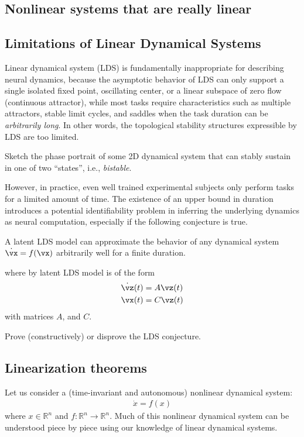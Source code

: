 \documentclass[a4paper,11pt]{exam}
\newcounter{ct}
\newcommand{\field}[1]{\ensuremath{\mathbb{#1}}}
\newcommand{\reals}{\field{R}}
\begin{document}
\begin{questions}
\newpage
\section{Nonlinear systems that are really linear}
\subsection{Limitations of Linear Dynamical Systems}
Linear dynamical system (LDS) is fundamentally inappropriate for describing neural dynamics, because the asymptotic behavior of LDS can only support a single isolated fixed point, oscillating center, or a linear subspace of zero flow (continuous attractor), while most tasks require characteristics such as multiple attractors, stable limit cycles, and saddles when the task duration can be \emph{arbitrarily long}.
In other words, the topological stability structures expressible by LDS are too limited.

\question Sketch the phase portrait of some 2D dynamical system that can stably sustain in one of two ``states'', i.e., \emph{bistable}.

However, in practice, even well trained experimental subjects only perform tasks for a limited amount of time.
The existence of an upper bound in duration introduces a potential identifiability problem in inferring the underlying dynamics as neural computation, especially if the following conjecture is true.
\begin{tcolorbox}[colback=red!10!white,title=Universal latent LDS conjecture]
    A latent LDS model can approximate the behavior of any dynamical system $\dot{\vx} = f(\vx)$ arbitrarily well for a finite duration.
\end{tcolorbox}
where by latent LDS model is of the form
\begin{align}
    \dot{\vz}(t) &= A \vz(t)
\\
    \vx(t) &= C \vz(t)
\end{align}
with matrices $A$, and $C$.


\question[10] Prove (constructively) or disprove the LDS conjecture.

\subsection{Linearization theorems}
Let us consider a (time-invariant and autonomous) nonlinear dynamical system:
\begin{align}
    \dot{x} = f(x)
\end{align}
where $x \in \reals^n$ and $f: \reals^n \to \reals^n$.
Much of this nonlinear dynamical system can be understood piece by piece using our knowledge of linear dynamical systems.


\end{questions}
\end{document}
